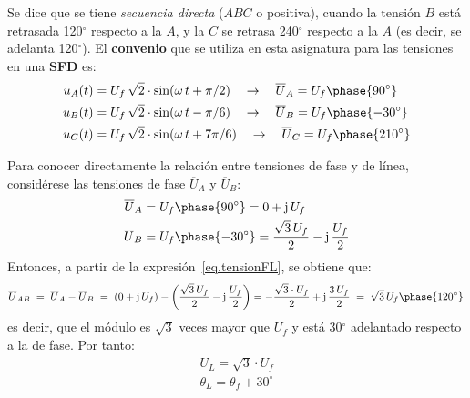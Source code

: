 	Se dice que se tiene \textit{secuencia directa} ($ABC$ o positiva), cuando la tensión $B$ está retrasada 120$^\circ$ respecto a la $A$, y la $C$ se retrasa 240$^\circ$ respecto a la $A$ (es decir, se adelanta 120$^\circ$). El \textbf{convenio} que se utiliza en esta asignatura para las tensiones en una \textbf{SFD} es:
	\begin{align*}
		u_A(t)&=U_f\,\sqrt{2}\cdot \sin(\omega\, t +\pi/2) \quad\rightarrow\quad \overline{U}_A=U_f\phase {90^\circ}\\
		u_B(t)&=U_f\,\sqrt{2}\cdot \sin(\omega\, t -\pi/6) \quad\rightarrow\quad \overline{U}_B=U_f\phase {-30^\circ}\\
		u_C(t)&=U_f\,\sqrt{2}\cdot \sin(\omega\,t +7\pi/6) \quad\rightarrow\quad \overline{U}_C=U_f\phase {210^\circ}
	\end{align*}
	
	Para conocer directamente la relación entre tensiones de fase y de línea, considérese las tensiones de fase $\overline{U}_A$ y $\overline{U}_B$: 
	\begin{align*}
		\overline{U}_A &= U_f\phase{90^\circ}=0+\mathrm{j}\,U_f
		\\
		\overline{U}_B &= U_f\phase{-30^\circ}=\dfrac{\sqrt{3}\,U_f}{2}-\mathrm{j}\,\dfrac{U_f}{2}
	\end{align*}
	Entonces, a partir de la expresión~\eqref{eq.tensionFL}, se obtiene que:
	\begin{equation*}
		\overline{U}_{AB} \;=\; \overline{U}_{A}-\overline{U}_{B} \;=\; (0+\mathrm{j}\,U_f)-\left(\dfrac{\sqrt{3}\,U_f}{2}-\mathrm{j}\,\dfrac{U_f}{2}\right)=-\dfrac{\sqrt{3}\cdot U_f}{2}+\mathrm{j}\,\dfrac{3\,U_f}{2} \;=\; \sqrt{3}\,U_f \phase{ 120^\circ}\,
	\end{equation*}
	es decir, que el módulo es $\sqrt{3}$ veces mayor que $U_f$ y está 30$^\circ$ adelantado respecto a la de fase. Por tanto:  
	\begin{equation}\label{eq.sfd_fase-linea}
		\boxed{
			\begin{array}{l}
				U_L = \sqrt{3}\cdot U_f\\
				\theta_L = \theta_f + 30^\circ\\
			\end{array}
		} 
	\end{equation}
	
